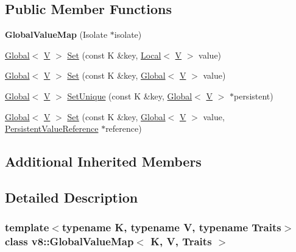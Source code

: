 \subsection*{Public Member Functions}
\begin{DoxyCompactItemize}
\item 
\mbox{\label{classv8_1_1GlobalValueMap_a60018c72fdae03d51b687d2a941140f4}} 
{\bfseries Global\+Value\+Map} (Isolate $\ast$isolate)
\item 
\mbox{\hyperlink{classv8_1_1Global}{Global}}$<$ \mbox{\hyperlink{classV}{V}} $>$ \mbox{\hyperlink{classv8_1_1GlobalValueMap_aa13f7914642c705b8e96824747ea115a}{Set}} (const K \&key, \mbox{\hyperlink{classv8_1_1Local}{Local}}$<$ \mbox{\hyperlink{classV}{V}} $>$ value)
\item 
\mbox{\hyperlink{classv8_1_1Global}{Global}}$<$ \mbox{\hyperlink{classV}{V}} $>$ \mbox{\hyperlink{classv8_1_1GlobalValueMap_ac2b02a0105393e6e3ab7e0aeeed9a294}{Set}} (const K \&key, \mbox{\hyperlink{classv8_1_1Global}{Global}}$<$ \mbox{\hyperlink{classV}{V}} $>$ value)
\item 
\mbox{\hyperlink{classv8_1_1Global}{Global}}$<$ \mbox{\hyperlink{classV}{V}} $>$ \mbox{\hyperlink{classv8_1_1GlobalValueMap_aad73de3912571a2f245454d3edea4a41}{Set\+Unique}} (const K \&key, \mbox{\hyperlink{classv8_1_1Global}{Global}}$<$ \mbox{\hyperlink{classV}{V}} $>$ $\ast$persistent)
\item 
\mbox{\hyperlink{classv8_1_1Global}{Global}}$<$ \mbox{\hyperlink{classV}{V}} $>$ \mbox{\hyperlink{classv8_1_1GlobalValueMap_aaa5fa26f751c8608716ad5578cd6c1d0}{Set}} (const K \&key, \mbox{\hyperlink{classv8_1_1Global}{Global}}$<$ \mbox{\hyperlink{classV}{V}} $>$ value, \mbox{\hyperlink{classv8_1_1PersistentValueMapBase_1_1PersistentValueReference}{Persistent\+Value\+Reference}} $\ast$reference)
\end{DoxyCompactItemize}
\subsection*{Additional Inherited Members}


\subsection{Detailed Description}
\subsubsection*{template$<$typename K, typename V, typename Traits$>$\newline
class v8\+::\+Global\+Value\+Map$<$ K, V, Traits $>$}



